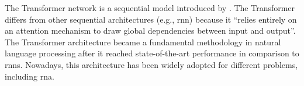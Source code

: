 

The Transformer network is a sequential model introduced by
\textcite{vaswani2017attention}. The Transformer differs
from other sequential architectures (e.g., \gls{rnn}) because it
``relies entirely on an attention mechanism to draw global
dependencies between input and output''. The Transformer architecture became a fundamental methodology in natural language processing after it reached state-of-the-art performance in comparison to \glspl{rnn}. Nowadays, this architecture has been widely adopted for different problems, including \gls{rna}.
